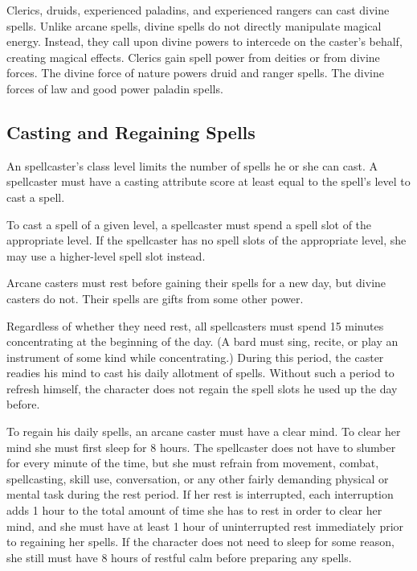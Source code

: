 Clerics, druids, experienced paladins, and experienced rangers can cast divine spells. Unlike arcane spells, divine spells do not directly manipulate magical energy. Instead, they call upon divine powers to intercede on the caster's behalf, creating magical effects. Clerics gain spell power from deities or from divine forces. The divine force of nature powers druid and ranger spells. The divine forces of law and good power paladin spells.

\subsection{Casting and Regaining Spells}
An spellcaster's class level limits the number of spells he or she can cast. A spellcaster must have a casting attribute score at least equal to the spell's level to cast a spell.

 To cast a spell of a given level, a spellcaster must spend a spell slot of the appropriate level. If the spellcaster has no spell slots of the appropriate level, she may use a higher-level spell slot instead.

 Arcane casters must rest before gaining their spells for a new day, but divine casters do not. Their spells are gifts from some other power.

Regardless of whether they need rest, all spellcasters must spend 15 minutes concentrating at the beginning of the day. (A bard must sing, recite, or play an instrument of some kind while concentrating.) During this period, the caster readies his mind to cast his daily allotment of spells. Without such a period to refresh himself, the character does not regain the spell slots he used up the day before.

 To regain his daily spells, an arcane caster must have a clear mind. To clear her mind she must first sleep for 8 hours. The spellcaster does not have to slumber for every minute of the time, but she must refrain from movement, combat, spellcasting, skill use, conversation, or any other fairly demanding physical or mental task during the rest period. If her rest is interrupted, each interruption adds 1 hour to the total amount of time she has to rest in order to clear her mind, and she must have at least 1 hour of uninterrupted rest immediately prior to regaining her spells. If the character does not need to sleep for some reason, she still must have 8 hours of restful calm before preparing any spells.


